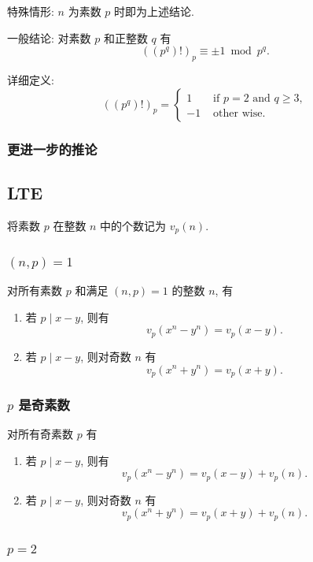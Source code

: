 \documentclass[UTF8, a4paper, titlepage, twoside]{ctexart}
\begin{document}
特殊情形: \(n\) 为素数 \(p\) 时即为上述结论.

一般结论: 对素数 \(p\) 和正整数 \(q\) 有 \[((p^q)!)_p \equiv \pm 1 \bmod p^q.\]

详细定义: 
\[
((p^q)!)_p = 
\begin{cases}
    1 & \text { if } p=2 \text { and } q \geqslant 3, \\
    -1 & \text { other wise. }
\end{cases}
\]

\subsubsection*{ 更进一步的推论 }

\subsection{ LTE }

将素数 $p$ 在整数 $n$ 中的个数记为 $v_p(n)$.

\subsubsection*{ \((n, p) = 1\) }

对所有素数 \(p\) 和满足 \((n, p) = 1\) 的整数 \(n\), 有
\begin{enumerate}
    \item 若 \(p \mid x - y\), 则有
        \[
            v_p(x^n - y^n) = v_p(x - y).
        \]
    \item 若 \(p \mid x - y\), 则对奇数 \(n\) 有
        \[
            v_p(x^n + y^n) = v_p(x + y).
        \]
\end{enumerate}

\subsubsection*{ \(p\) 是奇素数 }

对所有奇素数 \(p\) 有
\begin{enumerate}
    \item 若 \(p \mid x - y\), 则有
        \[
            v_p(x^n - y^n) = v_p(x - y) + v_p(n).
        \]
    \item 若 \(p \mid x - y\), 则对奇数 \(n\) 有
        \[
            v_p(x^n + y^n) = v_p(x + y) + v_p(n).
        \]
\end{enumerate}

\subsubsection*{ \(p = 2\) }
\end{document}
